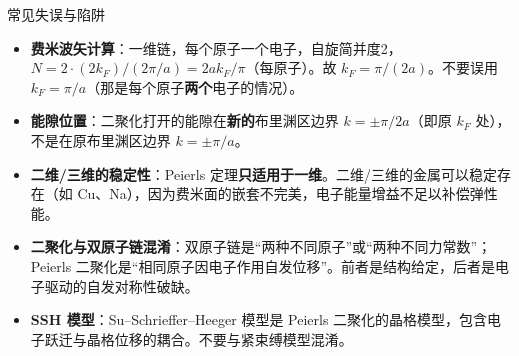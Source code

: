 \begin{errorbox}{常见失误与陷阱}
\begin{itemize}
    \item \textbf{费米波矢计算}：一维链，每个原子一个电子，自旋简并度2，$N=2\cdot(2k_F)/(2\pi/a)=2ak_F/\pi$（每原子）。故 $k_F=\pi/(2a)$。不要误用 $k_F=\pi/a$（那是每个原子\textbf{两个}电子的情况）。
    \item \textbf{能隙位置}：二聚化打开的能隙在\textbf{新的}布里渊区边界 $k=\pm\pi/2a$（即原 $k_F$ 处），不是在原布里渊区边界 $k=\pm\pi/a$。
    \item \textbf{二维/三维的稳定性}：Peierls 定理\textbf{只适用于一维}。二维/三维的金属可以稳定存在（如 Cu、Na），因为费米面的嵌套不完美，电子能量增益不足以补偿弹性能。
    \item \textbf{二聚化与双原子链混淆}：双原子链是``两种不同原子''或``两种不同力常数''；Peierls 二聚化是``相同原子因电子作用自发位移''。前者是结构给定，后者是电子驱动的自发对称性破缺。
    \item \textbf{SSH 模型}：Su--Schrieffer--Heeger 模型是 Peierls 二聚化的晶格模型，包含电子跃迁与晶格位移的耦合。不要与紧束缚模型混淆。
\end{itemize}
\end{errorbox}

